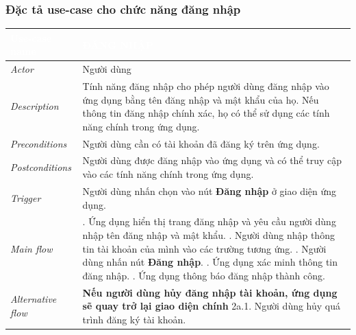 \subsubsection{Đặc tả use-case cho chức năng đăng nhập}
\begin{center}
    \arrayrulewidth=2pt
    \begin{longtable}{
        |>{\raggedright\arraybackslash}p{3cm}
        |>{\raggedright\arraybackslash}p{13cm}
        |}
        \hline
        \rowcolor{cyan!75!black} \textcolor{white}{\textbf{Use-case name}} & \textcolor{white}{\textbf{ĐĂNG NHẬP}}
        \\\hline
        \rowcolor{cyan!10!white} \textit{Actor} & Người dùng
        \\\hdashline
        \rowcolor{cyan!10!white} \textit{Description} & Tính năng đăng nhập cho phép người dùng đăng nhập vào ứng dụng bằng tên đăng nhập và mật khẩu của họ. Nếu thông tin đăng nhập chính xác, họ có thể sử dụng các tính năng chính trong ứng dụng.
        \\\hdashline
        \rowcolor{cyan!10!white} \textit{Preconditions} & Người dùng cần có tài khoản đã đăng ký trên ứng dụng.
        \\\hdashline
        \rowcolor{cyan!10!white} \textit{Postconditions} & Người dùng được đăng nhập vào ứng dụng và có thể truy cập vào các tính năng chính trong ứng dụng.
        \\\hdashline
        \rowcolor{cyan!10!white} \textit{Trigger} & Người dùng nhấn chọn vào nút \textbf{Đăng nhập} ở giao diện ứng dụng.
        \\\hdashline
        \rowcolor{cyan!10!white} \textit{Main flow} & 
        1. Ứng dụng hiển thị trang đăng nhập và yêu cầu người dùng nhập tên đăng nhập và mật khẩu. \newline
        2. Người dùng nhập thông tin tài khoản của mình vào các trường tương ứng. \newline
        3. Người dùng nhấn nút \textbf{Đăng nhập}. \newline
        4. Ứng dụng xác minh thông tin đăng nhập. \newline
        5. Ứng dụng thông báo đăng nhập thành công.
        \\\hdashline
        \rowcolor{cyan!10!white} \textit{Alternative flow} & 
        \textbf{Nếu người dùng hủy đăng nhập tài khoản, ứng dụng sẽ quay trở lại giao diện chính} \newline
        2a.1. Người dùng hủy quá trình đăng ký tài khoản. \newline

\end{longtable}
\end{center}

